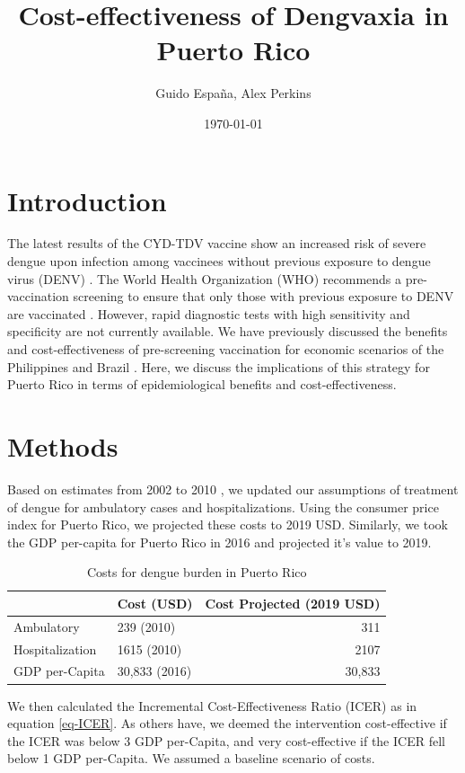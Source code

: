\documentclass[12pt]{article}
\author{Guido España, Alex Perkins}
\date{\today}
\title{Cost-effectiveness of Dengvaxia in Puerto Rico}
\begin{document}
\maketitle

\section{Introduction}
The latest results of the CYD-TDV vaccine show an increased risk of severe dengue upon infection among vaccinees without previous exposure to dengue virus (DENV) \cite{Sridhar2018}. The World Health Organization (WHO) recommends a pre-vaccination screening to ensure that only those with previous exposure to DENV are vaccinated \cite{WHO2018}. However, rapid diagnostic tests with high sensitivity and specificity are not currently available. We have previously discussed the benefits and cost-effectiveness of pre-screening vaccination for economic scenarios of the Philippines and Brazil \cite{Espana2019Biorxiv}. Here, we discuss the implications of this strategy for Puerto Rico in terms of epidemiological benefits and cost-effectiveness. 

\section{Methods}
Based on estimates from 2002 to 2010 \cite{Halasa2012}, we updated our assumptions of treatment of dengue for ambulatory cases and hospitalizations. Using the consumer price index for Puerto Rico, we projected these costs to 2019 USD. Similarly, we took the GDP per-capita for Puerto Rico in 2016 \cite{worldbank2016} and projected it's value to 2019. 

\begin{table}
  \begin{center}
    \begin{tabular}{|l|l|r|}
      \hline
      & Cost (USD) & Cost Projected (2019 USD)\\
      \hline
      Ambulatory & 239 (2010) & 311\\
      Hospitalization & 1615 (2010) & 2107\\
      GDP per-Capita & 30,833 (2016) & 30,833\\
      \hline
    \end{tabular}
  \end{center}
  \caption{Costs for dengue burden in Puerto Rico}
  \label{tbl-costs}
\end{table}

We then calculated the Incremental Cost-Effectiveness Ratio (ICER) as in equation \ref{eq-ICER}. As others have, we deemed the intervention cost-effective if the ICER was below 3 GDP per-Capita, and very cost-effective if the ICER fell below 1 GDP per-Capita. We assumed a baseline scenario of costs.
\end{document}
